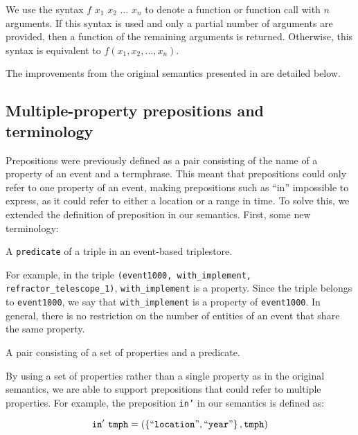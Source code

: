 \documentclass[../main.tex]{subfiles}
\begin{document}
We use the syntax $f$ $x_1$ $x_2$ $\dots$ $x_n$ to denote a function or function call with $n$ arguments.  If this syntax is used
and only a partial number of arguments are provided, then a function of the remaining arguments is returned.  Otherwise,
this syntax is equivalent to $f(x_1, x_2, \dots, x_n)$.

The improvements from the original semantics presented in
\cite{frost2014demonstration} \cite{frostagboola2014} are detailed below.

\subsection{Multiple-property prepositions and terminology}

Prepositions were previously defined as a pair consisting of the name of a property of an event and a termphrase.  This meant that prepositions could
only refer to one property of an event, making prepositions such as ``in''
impossible to express, as it could refer to either a location or a range in time.
To solve this, we extended the definition of preposition in our semantics.  First, some new terminology:

\begin{definition}[Property]
	A \texttt{predicate} of a triple in an event-based triplestore.
\end{definition}

For example, in the triple \texttt{(event1000, with\_implement, refractor\_telescope\_1)}, \texttt{with\_implement} is a property.  Since the triple belongs to \texttt{event1000}, we say that \texttt{with\_implement} is a property of \texttt{event1000}.  In general, there is no restriction on the number of entities of an event that share the same property.

\begin{definition}[Preposition]
	A pair consisting of a set of properties and a predicate.
\end{definition}

By using a set of properties rather than a single property as in the original semantics, we are able to support prepositions that could refer to multiple properties.
For example, the preposition \texttt{in'} in our semantics is defined as:

\begin{equation*}
	\mathtt{in'} \  \mathtt{tmph} = \left(\left\{\text{``\texttt{location}''}, \text{``\texttt{year}''}\right\}, \mathtt{tmph}\right)
\end{equation*}
\end{document}
